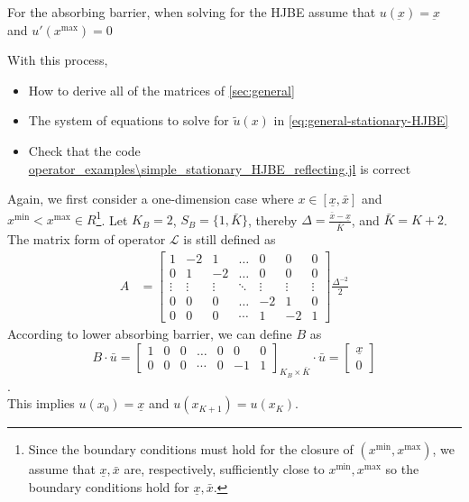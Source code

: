 \documentclass[11pt]{article}
\begin{document}
For the absorbing barrier, when solving for the HJBE assume that $u(\underbar{x}) = \underbar{x}$ and $u'(x^{\max}) = 0$


With this process,
\begin{itemize}
	\item How to derive all of the matrices of \cref{sec:general}
	\item The system of equations to solve for $\tilde{u}(x)$ in \cref{eq:general-stationary-HJBE}
	\item Check that the code \url{operator_examples\simple_stationary_HJBE_reflecting.jl} is correct
\end{itemize}

Again, we first consider a one-dimension case where $x\in [\underline{\textit{\~{x}}}, \bar{\textit{\~{x}}}]$ and $x^{\min} < x^{\max} \in R$\footnote{Since the boundary conditions must hold for the closure of $(x^{\min},x^{\max})$, we assume that $\underline{\textit{\~{x}}}, \bar{\textit{\~{x}}}$ are, respectively, sufficiently close to $x^{\min}, x^{\max}$ so the boundary conditions hold for $\underline{\textit{\~{x}}}, \bar{\textit{\~{x}}}$.}. Let $K_B = 2$, $S_B = \{1,\bar{K}\}$, thereby $\Delta  = \frac{\bar{\textit{\~{x}}}-\underline{\textit{\~{x}}}}{\bar{K}}$, and $\bar{K} = K+2$. The matrix form of operator $\mathcal{L}$ is still defined as
\begin{align}
A &= \begin{bmatrix}
1&-2&1&\dots&0&0&0\\
0&1&-2&\dots&0&0&0\\
\vdots&\vdots&\vdots&\ddots&\vdots&\vdots&\vdots\\
0&0&0&\dots&-2&1&0\\
0&0&0&\cdots&1&-2&1
\end{bmatrix}\frac{\Delta^{-2}}{2}
\end{align}
According to lower absorbing barrier, we can define $B$ as
\begin{equation}
B\cdot\bar{u} =\begin{bmatrix}
1&0&0&\dots&0&0&0\\
0&0&0&\cdots&0&-1&1
\end{bmatrix}_{K_B\times \bar{K}}\cdot\bar{u} = \begin{bmatrix}
\underline{\textit{\~{x}}}\\
0
\end{bmatrix}
\end{equation}.\\
This implies $u(x_0) = \underline{\textit{\~{x}}}$ and $u(x_{K+1}) = u(x_K)$.\\
\end{document}
